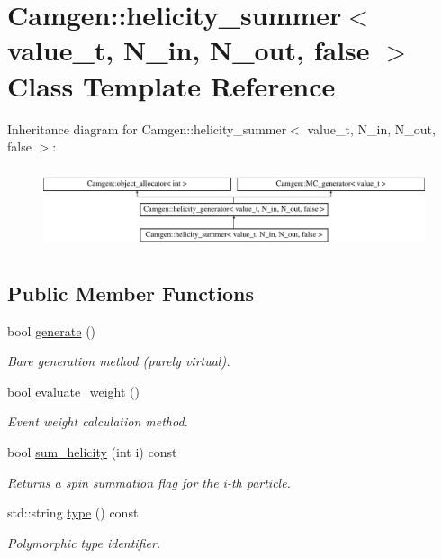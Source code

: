\hypertarget{a00280}{}\section{Camgen\+:\+:helicity\+\_\+summer$<$ value\+\_\+t, N\+\_\+in, N\+\_\+out, false $>$ Class Template Reference}
\label{a00280}
Inheritance diagram for Camgen\+:\+:helicity\+\_\+summer$<$ value\+\_\+t, N\+\_\+in, N\+\_\+out, false $>$\+:\begin{figure}[H]
\begin{center}
\leavevmode
\includegraphics[height=2.386364cm]{a00280}
\end{center}
\end{figure}
\subsection*{Public Member Functions}
\begin{DoxyCompactItemize}
\item 
bool \hyperlink{a00280_a7230e7f5ee3f70fcd181911f2f4cf4f6}{generate} ()
\begin{DoxyCompactList}\small\item\em \textquotesingle{}Bare generation\textquotesingle{} method (purely virtual). \end{DoxyCompactList}\item 
\hypertarget{a00280_a967aa3d843f335438852b44d385358e2}{}bool \hyperlink{a00280_a967aa3d843f335438852b44d385358e2}{evaluate\+\_\+weight} ()\label{a00280_a967aa3d843f335438852b44d385358e2}

\begin{DoxyCompactList}\small\item\em Event weight calculation method. \end{DoxyCompactList}\item 
bool \hyperlink{a00280_a919700d1b7e3d0fb241ec68ce89c234f}{sum\+\_\+helicity} (int i) const 
\begin{DoxyCompactList}\small\item\em Returns a spin summation flag for the i-\/th particle. \end{DoxyCompactList}\item 
\hypertarget{a00280_aa969143fe1fa7ff42b382bb2803f711f}{}std\+::string \hyperlink{a00280_aa969143fe1fa7ff42b382bb2803f711f}{type} () const \label{a00280_aa969143fe1fa7ff42b382bb2803f711f}

\begin{DoxyCompactList}\small\item\em Polymorphic type identifier. \end{DoxyCompactList}\end{DoxyCompactItemize}
